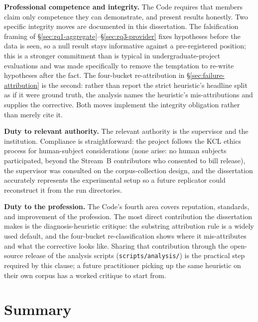\textbf{Professional competence and integrity.} The Code requires that
members claim only competence they can demonstrate, and present results
honestly. Two specific integrity moves are documented in this dissertation. The
falsification framing of \S\ref{sec:rq1-aggregate}--\S\ref{sec:rq3-provider}
fixes hypotheses before the data is seen, so a null result stays informative
against a pre-registered position; this is a stronger commitment than is
typical in undergraduate-project evaluations and was made specifically to
remove the temptation to re-write hypotheses after the fact. The four-bucket
re-attribution in \S\ref{sec:failure-attribution} is the second: rather than
report the strict heuristic's headline split as if it were ground truth, the
analysis names the heuristic's mis-attributions and supplies the corrective.
Both moves implement the integrity obligation rather than merely cite it.

\textbf{Duty to relevant authority.} The relevant authority is the supervisor
and the institution. Compliance is straightforward: the project follows the
KCL ethics process for human-subject considerations (none arise: no human
subjects participated, beyond the Stream~B contributors who consented to bill
release), the supervisor was consulted on the corpus-collection design, and
the dissertation accurately represents the experimental setup so a future
replicator could reconstruct it from the run directories.

\textbf{Duty to the profession.} The Code's fourth area covers reputation,
standards, and improvement of the profession. The most direct contribution
the dissertation makes is the diagnosis-heuristic critique: the substring
attribution rule is a widely used default, and the four-bucket re-classification
shows where it mis-attributes and what the corrective looks like. Sharing
that contribution through the open-source release of the analysis scripts
(\texttt{scripts/analysis/}) is the practical step required by this clause; a
future practitioner picking up the same heuristic on their own corpus has a
worked critique to start from.

\section{Summary}
\label{sec:lsesp-summary}

